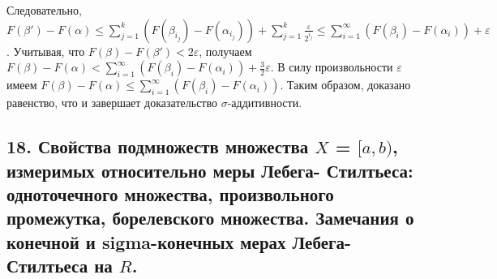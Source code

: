 \documentclass[12pt]{article}
\begin{document}
Следовательно, $F(\beta')-F(\alpha)\leq\sum_{j=1}^k(F(\beta_{i_j})-F(\alpha_{i_j}))+\sum_{j=1}^k\tfrac{\varepsilon}{2^{i_j}}\leq\sum_{i=1}^\infty(F(\beta_i)-F(\alpha_i))+\varepsilon$. Учитывая, что $F(\beta)-F(\beta')<2\varepsilon$, получаем $F(\beta)-F(\alpha)<\sum_{i=1}^\infty(F(\beta_i)-F(\alpha_i))+\tfrac{3}{2}\varepsilon$. В силу произвольности $\varepsilon$ имеем $F(\beta)-F(\alpha)\leq\sum_{i=1}^\infty(F(\beta_i)-F(\alpha_i))$. Таким образом, доказано равенство, что и завершает доказательство $\sigma$-аддитивности.

\subsection*{18. Свойства подмножеств множества $X$ = $[a,b)$, измеримых относительно меры Лебега-
Стилтьеса: одноточечного множества, произвольного промежутка, борелевского
множества. Замечания о конечной и sigma-конечных мерах Лебега-Стилтьеса на $R$.}
\end{document}
